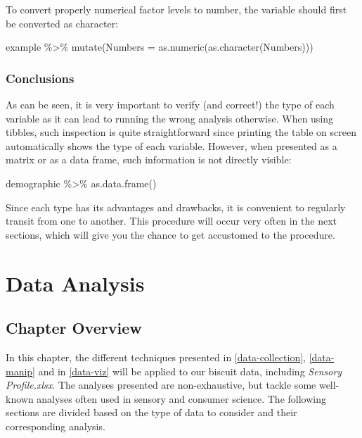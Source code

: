 \documentclass[
]{book}
\newenvironment{Shaded}{\begin{snugshade}}{\end{snugshade}}
\newcommand{\AttributeTok}[1]{\textcolor[rgb]{0.77,0.63,0.00}{#1}}
\newcommand{\FunctionTok}[1]{\textcolor[rgb]{0.00,0.00,0.00}{#1}}
\newcommand{\NormalTok}[1]{#1}
\newcommand{\SpecialCharTok}[1]{\textcolor[rgb]{0.00,0.00,0.00}{#1}}
\begin{document}
To convert properly numerical factor levels to number, the variable should first be converted as character:

\begin{Shaded}
\begin{Highlighting}[]
\NormalTok{example }\SpecialCharTok{\%\textgreater{}\%}
  \FunctionTok{mutate}\NormalTok{(}\AttributeTok{Numbers =} \FunctionTok{as.numeric}\NormalTok{(}\FunctionTok{as.character}\NormalTok{(Numbers)))}
\end{Highlighting}
\end{Shaded}

\hypertarget{conclusions}{%
\subsection{Conclusions}\label{conclusions}}

As can be seen, it is very important to verify (and correct!) the type of each variable as it can lead to running the wrong analysis otherwise. When using tibbles, such inspection is quite straightforward since printing the table on screen automatically shows the type of each variable. However, when presented as a matrix or as a data frame, such information is not directly visible:

\begin{Shaded}
\begin{Highlighting}[]
\NormalTok{demographic }\SpecialCharTok{\%\textgreater{}\%} 
  \FunctionTok{as.data.frame}\NormalTok{()}
\end{Highlighting}
\end{Shaded}

Since each type has its advantages and drawbacks, it is convenient to regularly transit from one to another. This procedure will occur very often in the next sections, which will give you the chance to get accustomed to the procedure.

\hypertarget{data-analysis}{%
\chapter{Data Analysis}\label{data-analysis}}

\hypertarget{chapter-overview-1}{%
\section{Chapter Overview}\label{chapter-overview-1}}

In this chapter, the different techniques presented in \ref{data-collection}, \ref{data-manip} and in \ref{data-viz} will be applied to our biscuit data, including \emph{Sensory Profile.xlsx}.
The analyses presented are non-exhaustive, but tackle some well-known analyses often used in sensory and consumer science.
The following sections are divided based on the type of data to consider and their corresponding analysis.
\end{document}

